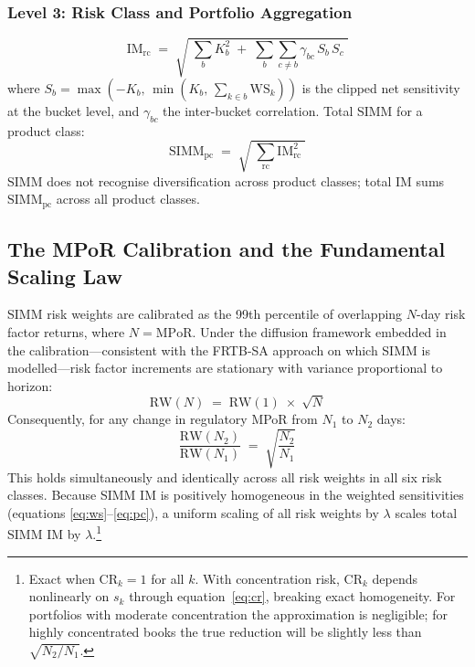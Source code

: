 \documentclass[12pt,letterpaper]{article}
\numberwithin{equation}{section}
\theoremstyle{remark}
\newcommand{\SIMM}{\mathrm{SIMM}}
\newcommand{\RW}{\mathrm{RW}}
\newcommand{\MPoR}{\mathrm{MPoR}}
\newcommand{\WS}{\mathrm{WS}}
\newcommand{\CR}{\mathrm{CR}}
\newcommand{\Kb}{K_b}
\newcommand{\Sb}{S_b}
\begin{document}
\subsubsection*{Level 3: Risk Class and Portfolio Aggregation}

\begin{equation}
  \mathrm{IM}_{\mathrm{rc}} \;=\;
  \sqrt{\;\sum_b \Kb^2 \;+\;
  \sum_b\sum_{c \neq b}\gamma_{bc}\,\Sb\,S_c\;}
  \label{eq:rc}
\end{equation}
where $\Sb = \max(-\Kb,\,\min(\Kb,\,\sum_{k\in b}\WS_k))$ is the clipped
net sensitivity at the bucket level, and $\gamma_{bc}$ the inter-bucket
correlation. Total SIMM for a product class:
\begin{equation}
  \SIMM_{\mathrm{pc}} \;=\;\sqrt{\;\sum_{\mathrm{rc}}\mathrm{IM}_{\mathrm{rc}}^2\;}
  \label{eq:pc}
\end{equation}
SIMM does not recognise diversification across product classes; total IM
sums $\SIMM_{\mathrm{pc}}$ across all product classes.

\subsection{The MPoR Calibration and the Fundamental Scaling Law}

SIMM risk weights are calibrated as the 99th percentile of overlapping
$N$-day risk factor returns, where $N = \MPoR$. Under the diffusion
framework embedded in the calibration---consistent with the FRTB-SA approach
on which SIMM is modelled---risk factor increments are stationary with
variance proportional to horizon:
\begin{equation}
  \RW(N) \;=\; \RW(1)\;\times\;\sqrt{N}
  \label{eq:scaling}
\end{equation}
Consequently, for any change in regulatory MPoR from $N_1$ to $N_2$ days:
\begin{equation}
  \frac{\RW(N_2)}{\RW(N_1)} \;=\; \sqrt{\frac{N_2}{N_1}}
  \label{eq:ratio}
\end{equation}
This holds simultaneously and identically across all risk weights in all
six risk classes. Because SIMM IM is positively homogeneous in the weighted
sensitivities (equations \ref{eq:ws}--\ref{eq:pc}), a uniform scaling of
all risk weights by $\lambda$ scales total SIMM IM by $\lambda$.\footnote{%
  Exact when $\CR_k = 1$ for all $k$. With concentration risk, $\CR_k$
  depends nonlinearly on $s_k$ through equation~\eqref{eq:cr}, breaking
  exact homogeneity. For portfolios with moderate concentration the
  approximation is negligible; for highly concentrated books the true
  reduction will be slightly less than $\sqrt{N_2/N_1}$.}
\end{document}
